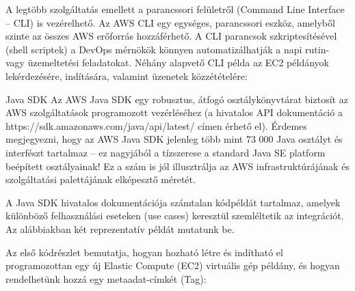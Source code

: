 \documentclass[
]{article}
\newenvironment{Shaded}{}{}
\newcommand{\AttributeTok}[1]{\textcolor[rgb]{0.49,0.56,0.16}{#1}}
\newcommand{\ExtensionTok}[1]{#1}
\newcommand{\NormalTok}[1]{#1}
\newcommand{\StringTok}[1]{\textcolor[rgb]{0.25,0.44,0.63}{#1}}
\begin{document}
A legtöbb szolgáltatás emellett a parancssori felületről (Command Line
Interface -- CLI) is vezérelhető. Az AWS CLI egy egységes, parancssori
eszköz, amelyből szinte az összes AWS erőforrás hozzáférhető. A CLI
parancsok szkriptesítésével (shell scriptek) a DevOps mérnökök könnyen
automatizálhatják a napi rutin- vagy üzemeltetési feladatokat. Néhány
alapvető CLI példa az EC2 példányok lekérdezésére, indítására, valamint
üzenetek közzétételére:

\begin{Shaded}
\end{Shaded}

Java SDK Az AWS Java SDK egy robusztus, átfogó osztálykönyvtárat
biztosít az AWS szolgáltatások programozott vezérléséhez (a hivatalos
API dokumentáció a https://sdk.amazonaws.com/java/api/latest/ címen
érhető el). Érdemes megjegyezni, hogy az AWS Java SDK jelenleg több mint
73 000 Java osztályt és interfészt tartalmaz -- ez nagyjából a
tízszerese a standard Java SE platform beépített osztályainak! Ez a szám
is jól illusztrálja az AWS infrastruktúrájának és szolgáltatási
palettájának elképesztő méretét.

A Java SDK hivatalos dokumentációja számtalan kódpéldát tartalmaz,
amelyek különböző felhasználási eseteken (use cases) keresztül
szemléltetik az integrációt. Az alábbiakban két reprezentatív példát
mutatunk be.

Az első kódrészlet bemutatja, hogyan hozható létre és indítható el
programozottan egy új Elastic Compute (EC2) virtuális gép példány, és
hogyan rendelhetünk hozzá egy metaadat-címkét (Tag):
\end{document}
